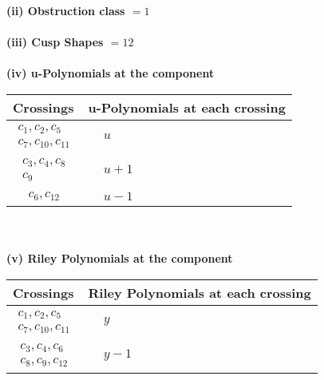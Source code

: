 \documentclass[1p]{elsarticle_modified}
\theoremstyle{definition}
\begin{document}
\flushleft \textbf{(ii) Obstruction class $= 1$}\\~\\
\flushleft \textbf{(iii) Cusp Shapes $= 12$}\\~\\
\newpage\renewcommand{\arraystretch}{1}
\flushleft \textbf{(iv) u-Polynomials at the component}\newline \\
\begin{tabular}{m{50pt}|m{274pt}}
Crossings & \hspace{64pt}u-Polynomials at each crossing \\
\hline $$\begin{aligned}c_{1},c_{2},c_{5}\\c_{7},c_{10},c_{11}\end{aligned}$$&$\begin{aligned}
&u
\end{aligned}$\\
\hline $$\begin{aligned}c_{3},c_{4},c_{8}\\c_{9}\end{aligned}$$&$\begin{aligned}
&u+1
\end{aligned}$\\
\hline $$\begin{aligned}c_{6},c_{12}\end{aligned}$$&$\begin{aligned}
&u-1
\end{aligned}$\\
\hline
\end{tabular}\\~\\
\newpage\renewcommand{\arraystretch}{1}
\flushleft \textbf{(v) Riley Polynomials at the component}\newline \\
\begin{tabular}{m{50pt}|m{274pt}}
Crossings & \hspace{64pt}Riley Polynomials at each crossing \\
\hline $$\begin{aligned}c_{1},c_{2},c_{5}\\c_{7},c_{10},c_{11}\end{aligned}$$&$\begin{aligned}
&y
\end{aligned}$\\
\hline $$\begin{aligned}c_{3},c_{4},c_{6}\\c_{8},c_{9},c_{12}\end{aligned}$$&$\begin{aligned}
&y-1
\end{aligned}$\\
\hline
\end{tabular}\\~\\
\end{document}
